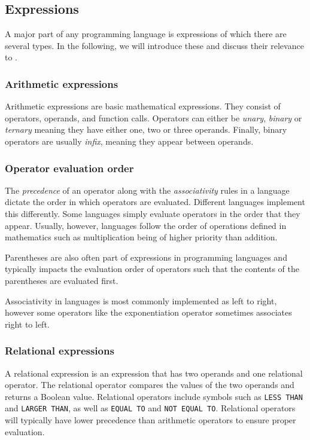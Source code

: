 \subsection{Expressions}
A major part of any programming language is expressions of which there are several types\cite{sebesta_concepts_2016}.
In the following, we will introduce these and discuss their relevance to \dazel{}.

\subsubsection*{Arithmetic expressions}
Arithmetic expressions are basic mathematical expressions.
They consist of operators, operands, and function calls. 
Operators can either be \textit{unary}, \textit{binary} or \textit{ternary} meaning they have either one, two or three operands.
Finally, binary operators are usually \textit{infix}, meaning they appear between operands\cite{sebesta_concepts_2016}.

\subsubsection*{Operator evaluation order}
The \textit{precedence} of an operator along with the \textit{associativity} rules in a language dictate the order in which operators are evaluated.
Different languages implement this differently. Some languages simply evaluate operators in the order that they appear. Usually, however, languages follow the order of operations defined in mathematics such as multiplication being of higher priority than addition\cite{sebesta_concepts_2016}.


Parentheses are also often part of expressions in programming languages and typically impacts the evaluation order of operators such that the contents of the parentheses are evaluated first\cite{sebesta_concepts_2016}.


Associativity in languages is most commonly implemented as left to right, however some operators like the exponentiation operator sometimes associates right to left\cite{sebesta_concepts_2016}. 

\subsubsection*{Relational expressions}
A relational expression is an expression that has two operands and one relational operator. The relational operator compares the values of the two operands and returns a
Boolean value. Relational operators include symbols such as \texttt{LESS THAN} and \texttt{LARGER THAN}, as well as \texttt{EQUAL TO} and
\texttt{NOT EQUAL TO}. 
Relational operators will typically have lower precedence than arithmetic operators to ensure proper evaluation\cite{sebesta_concepts_2016}.


